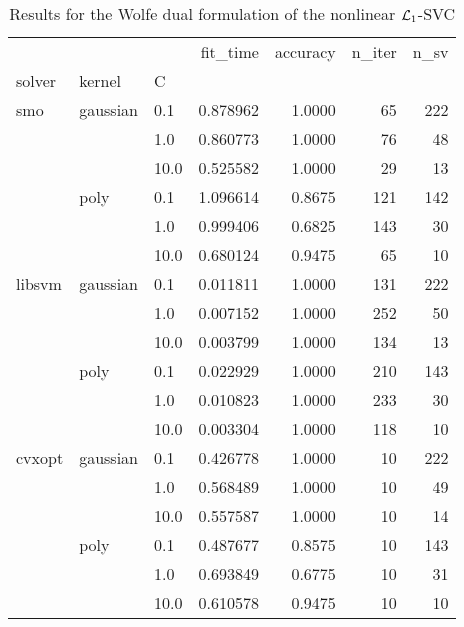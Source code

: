 \begin{table}[H]
\centering
\caption{Results for the Wolfe dual formulation of the nonlinear $\protect \mathcal{L}_1$-SVC}
\label{nonlinear_dual_l1_svc_cv_results}
\begin{tabular}{lllrrrr}
\toprule
       &      &      &  fit\_time &  accuracy &  n\_iter &  n\_sv \\
solver & kernel & C &           &           &         &       \\
\midrule
smo & gaussian & 0.1  &  0.878962 &    1.0000 &      65 &   222 \\
       &      & 1.0  &  0.860773 &    1.0000 &      76 &    48 \\
       &      & 10.0 &  0.525582 &    1.0000 &      29 &    13 \\
       & poly & 0.1  &  1.096614 &    0.8675 &     121 &   142 \\
       &      & 1.0  &  0.999406 &    0.6825 &     143 &    30 \\
       &      & 10.0 &  0.680124 &    0.9475 &      65 &    10 \\
libsvm & gaussian & 0.1  &  0.011811 &    1.0000 &     131 &   222 \\
       &      & 1.0  &  0.007152 &    1.0000 &     252 &    50 \\
       &      & 10.0 &  0.003799 &    1.0000 &     134 &    13 \\
       & poly & 0.1  &  0.022929 &    1.0000 &     210 &   143 \\
       &      & 1.0  &  0.010823 &    1.0000 &     233 &    30 \\
       &      & 10.0 &  0.003304 &    1.0000 &     118 &    10 \\
cvxopt & gaussian & 0.1  &  0.426778 &    1.0000 &      10 &   222 \\
       &      & 1.0  &  0.568489 &    1.0000 &      10 &    49 \\
       &      & 10.0 &  0.557587 &    1.0000 &      10 &    14 \\
       & poly & 0.1  &  0.487677 &    0.8575 &      10 &   143 \\
       &      & 1.0  &  0.693849 &    0.6775 &      10 &    31 \\
       &      & 10.0 &  0.610578 &    0.9475 &      10 &    10 \\
\bottomrule
\end{tabular}
\end{table}

